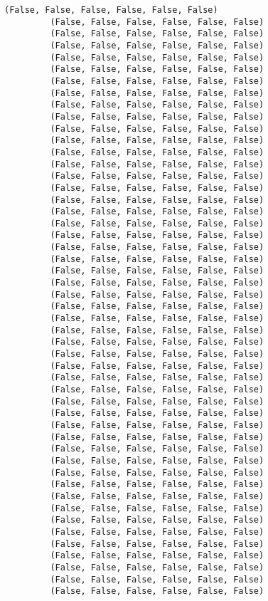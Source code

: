 \documentclass{article}
\begin{document}
\begin{Verbatim}[commandchars=\\\{\}]
         (False, False, False, False, False, False)
         (False, False, False, False, False, False)
         (False, False, False, False, False, False)
         (False, False, False, False, False, False)
         (False, False, False, False, False, False)
         (False, False, False, False, False, False)
         (False, False, False, False, False, False)
         (False, False, False, False, False, False)
         (False, False, False, False, False, False)
         (False, False, False, False, False, False)
         (False, False, False, False, False, False)
         (False, False, False, False, False, False)
         (False, False, False, False, False, False)
         (False, False, False, False, False, False)
         (False, False, False, False, False, False)
         (False, False, False, False, False, False)
         (False, False, False, False, False, False)
         (False, False, False, False, False, False)
         (False, False, False, False, False, False)
         (False, False, False, False, False, False)
         (False, False, False, False, False, False)
         (False, False, False, False, False, False)
         (False, False, False, False, False, False)
         (False, False, False, False, False, False)
         (False, False, False, False, False, False)
         (False, False, False, False, False, False)
         (False, False, False, False, False, False)
         (False, False, False, False, False, False)
         (False, False, False, False, False, False)
         (False, False, False, False, False, False)
         (False, False, False, False, False, False)
         (False, False, False, False, False, False)
         (False, False, False, False, False, False)
         (False, False, False, False, False, False)
         (False, False, False, False, False, False)
         (False, False, False, False, False, False)
         (False, False, False, False, False, False)
         (False, False, False, False, False, False)
         (False, False, False, False, False, False)
         (False, False, False, False, False, False)
         (False, False, False, False, False, False)
         (False, False, False, False, False, False)
         (False, False, False, False, False, False)
         (False, False, False, False, False, False)
         (False, False, False, False, False, False)
         (False, False, False, False, False, False)
         (False, False, False, False, False, False)
         (False, False, False, False, False, False)
         (False, False, False, False, False, False)
         (False, False, False, False, False, False)

\end{Verbatim}
\end{document}
